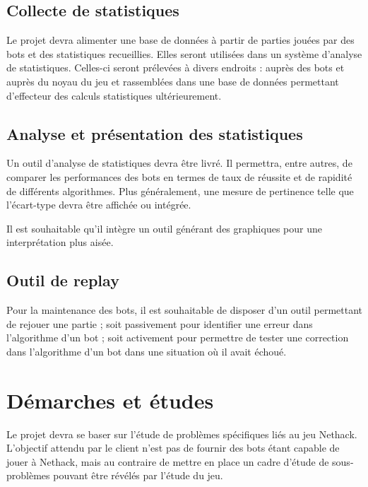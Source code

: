 \documentclass[12pt]{article}
\begin{document}
\subsection{Collecte de statistiques}

Le projet devra alimenter une base de données à partir de parties jouées par des bots et des statistiques recueillies. Elles seront utilisées dans un système d'analyse de statistiques. Celles-ci seront prélevées à divers endroits : auprès des bots et auprès du noyau du jeu et rassemblées dans une base de données permettant d'effecteur des calculs statistiques ultérieurement.

\subsection{Analyse et présentation des statistiques}

Un outil d'analyse de statistiques devra être livré. Il permettra, entre autres, de comparer les performances des bots en termes de taux de réussite et de rapidité de différents algorithmes. Plus généralement, une mesure de pertinence telle que l'écart-type devra être affichée ou intégrée.

Il est souhaitable qu'il intègre un outil générant des graphiques pour une interprétation plus aisée.

\subsection{Outil de replay}

Pour la maintenance des bots, il est souhaitable de disposer d'un outil permettant de rejouer une partie ; soit passivement pour identifier une erreur dans l'algorithme d'un bot ; soit activement pour permettre de tester une correction dans l'algorithme d'un bot dans une situation où il avait échoué.

\section{Démarches et études}

Le projet devra se baser sur l'étude de problèmes spécifiques liés au jeu Nethack. L'objectif attendu par le client n'est pas de fournir des bots étant capable de jouer à Nethack, mais au contraire de mettre en place un cadre d'étude de sous-problèmes pouvant être révélés par l'étude du jeu.
\end{document}
